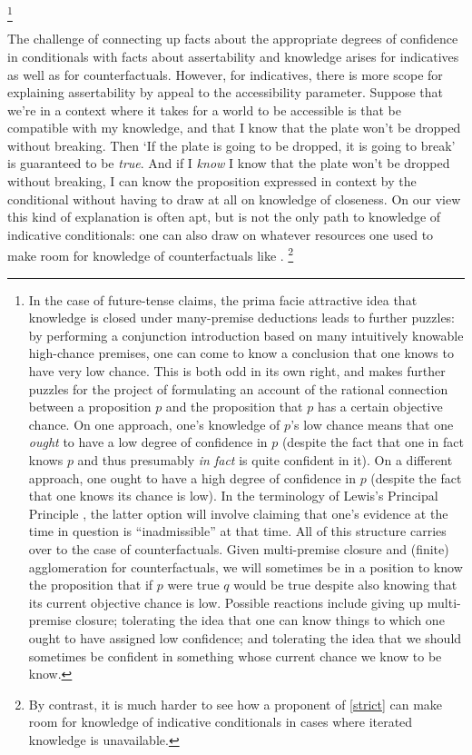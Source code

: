 \documentclass[If.tex]{subfiles}
\begin{document}
\footnote{In the case of future-tense claims, the prima facie attractive idea that knowledge is closed under many-premise deductions leads to further puzzles: by performing a conjunction introduction based on many intuitively knowable high-chance premises, one can come to know a conclusion that one knows to have very low chance. This is both odd in its own right, and makes further puzzles for the project of formulating an account of the rational connection between a proposition $p$ and the proposition that $p$ has a certain objective chance.  On one approach, one's knowledge of $p$'s low chance means that one \emph{ought} to have a low degree of confidence in $p$ (despite the fact that one in fact knows $p$ and thus presumably \emph{in fact} is quite confident in it).  On a different approach, one ought to have a high degree of confidence in $p$ (despite the fact that one knows its chance is low).  In the terminology of Lewis's Principal Principle \citep{LewisSGOC}, the latter option will involve claiming that one's evidence at the time in question is “inadmissible” at that time.  All of this structure carries over to the case of counterfactuals.  Given multi-premise closure and (finite) agglomeration for counterfactuals, we will sometimes be in a position to know the proposition that if $p$ were true $q$ would be true despite also knowing that its current objective chance is low.  Possible reactions include giving up multi-premise closure; tolerating the idea that one can know things to which one ought to have assigned low confidence; and tolerating the idea that we should sometimes be confident in something whose current chance we know to be know.}

The challenge of connecting up facts about the appropriate degrees of confidence in conditionals with facts about assertability and knowledge arises for indicatives as well as for counterfactuals. However, for indicatives, there is more scope for explaining assertability by appeal to the accessibility parameter. Suppose that we're in a context where it takes for a world to be accessible is that be compatible with my knowledge, and that I know that the plate won't be dropped without breaking.  Then ‘If the plate is going to be dropped, it is going to break’ is guaranteed to be \emph{true}.  And if I \emph{know} I know that the plate won't be dropped without breaking, I can know the proposition expressed in context by the conditional without having to draw at all on knowledge of closeness.  On our view this kind of explanation is often apt, but is not the only path to knowledge of indicative conditionals: one can also draw on whatever resources one used to make room for knowledge of counterfactuals like .%
\footnote{By contrast, it is much harder to see how a proponent of \ref{strict} can make room for knowledge of indicative conditionals in cases where iterated knowledge is unavailable.}
\end{document}
